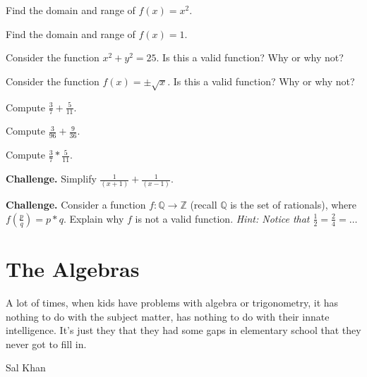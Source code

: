 \documentclass{scrbook}
\theoremstyle{definition}
\newenvironment{exercise}[1]{%
  \renewcommand\theexerciseinner{#1}%
  \exerciseinner
}{\endexerciseinner}
\newcommand{\Q}{\mathbb{Q}}
\newcommand{\Z}{\mathbb{Z}}
\begin{document}
\begin{exercise}{1.5.2}
Find the domain and range of $f(x) = x^2$.
\end{exercise}

\begin{exercise}{1.5.3}
Find the domain and range of $f(x) = 1$.
\end{exercise}

\begin{exercise}{1.5.4}
Consider the function $x^2 + y^2 = 25$. Is this a valid function? Why or why not?
\end{exercise}

\begin{exercise}{1.5.5}
Consider the function $f(x) = \pm\sqrt{x}$. Is this a valid function? Why or why not? 
\end{exercise}

\begin{exercise}{1.5.6}
Compute $\frac{3}{7} + \frac{5}{11}$.
\end{exercise}

\begin{exercise}{1.5.7}
Compute $\frac{3}{96} + \frac{9}{36}$. 
\end{exercise}

\begin{exercise}{1.5.8}
Compute $\frac{3}{7} * \frac{5}{11}$. 
\end{exercise}

\begin{exercise}{1.5.9}
\textbf{Challenge.}
Simplify $\frac{1}{(x+1)} + \frac{1}{(x-1)}$. 
\end{exercise}

\begin{exercise}{1.5.10}
\textbf{Challenge.}
Consider a function $f : \Q \longrightarrow \Z$ (recall $\Q$ is the set of rationals), where $f(\frac{p}{q}) = p * q$. Explain why $f$ is not a valid function. \textit{Hint: Notice that $\frac{1}{2} = \frac{2}{4} = \dots$}
\end{exercise}

\chapter{The Algebras}
\epigraph{A lot of times, when kids have problems with algebra or trigonometry, it has nothing to do with the subject matter, has nothing to do with their innate intelligence. It's just they that they had some gaps in elementary school that they never got to fill in.}{Sal Khan}





\end{document}
